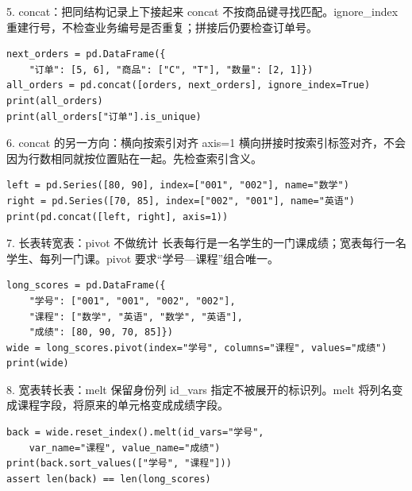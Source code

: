 \begin{frame}[fragile]{5. concat：把同结构记录上下接起来}
\small concat 不按商品键寻找匹配。ignore\_index 重建行号，不检查业务编号是否重复；拼接后仍要检查订单号。
\medskip
\begin{lstlisting}
next_orders = pd.DataFrame({
    "订单": [5, 6], "商品": ["C", "T"], "数量": [2, 1]})
all_orders = pd.concat([orders, next_orders], ignore_index=True)
print(all_orders)
print(all_orders["订单"].is_unique)
\end{lstlisting}
\end{frame}

\begin{frame}[fragile]{6. concat 的另一方向：横向按索引对齐}
\small axis=1 横向拼接时按索引标签对齐，不会因为行数相同就按位置贴在一起。先检查索引含义。
\medskip
\begin{lstlisting}
left = pd.Series([80, 90], index=["001", "002"], name="数学")
right = pd.Series([70, 85], index=["002", "001"], name="英语")
print(pd.concat([left, right], axis=1))
\end{lstlisting}
\end{frame}

\begin{frame}[fragile]{7. 长表转宽表：pivot 不做统计}
\small 长表每行是一名学生的一门课成绩；宽表每行一名学生、每列一门课。pivot 要求“学号—课程”组合唯一。
\medskip
\begin{lstlisting}
long_scores = pd.DataFrame({
    "学号": ["001", "001", "002", "002"],
    "课程": ["数学", "英语", "数学", "英语"],
    "成绩": [80, 90, 70, 85]})
wide = long_scores.pivot(index="学号", columns="课程", values="成绩")
print(wide)
\end{lstlisting}
\end{frame}

\begin{frame}[fragile]{8. 宽表转长表：melt 保留身份列}
\small id\_vars 指定不被展开的标识列。melt 将列名变成课程字段，将原来的单元格变成成绩字段。
\medskip
\begin{lstlisting}
back = wide.reset_index().melt(id_vars="学号",
    var_name="课程", value_name="成绩")
print(back.sort_values(["学号", "课程"]))
assert len(back) == len(long_scores)
\end{lstlisting}
\end{frame}

